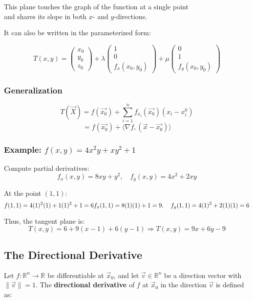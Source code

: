 \noindent This plane touches the graph of the function at a single point\\
and shares its slope in both \( x \)- and \( y \)-directions.

\noindent It can also be written in the parameterized form:

\[
T(x,y) = \begin{pmatrix} x_0\\ y_0\\ z_0\end{pmatrix} + \lambda 
\begin{pmatrix} 1\\ 0 \\ f_x(x_0,y_0)\end{pmatrix} + \mu \begin{pmatrix}
0 \\ 1 \\ f_y(x_0, y_0)
\end{pmatrix}
\]

\subsubsection{Generalization}
\[
T(\vec{X}) = f(\vec{x_0}) + \sum_{i = 1}^{n} f_{x_i}(\vec{x_0})(x_i - x_{i}^0)
\]
\[
 = f(\vec{x_0}) + \langle \nabla f, (\vec{x} - \vec{x_0})\rangle
\]

\subsubsection*{Example: \( f(x, y) = 4x^2y + xy^2 + 1 \)}

Compute partial derivatives:
\[
f_x(x, y) = 8xy + y^2, \quad f_y(x, y) = 4x^2 + 2xy
\]

At the point \( (1, 1) \):
\[
f(1, 1) = 4(1)^2(1) + 1(1)^2 + 1 = 6 \\
f_x(1, 1) = 8(1)(1) + 1 = 9, \quad f_y(1, 1) = 4(1)^2 + 2(1)(1) = 6
\]

Thus, the tangent plane is:
\[
T(x, y) = 6 + 9(x - 1) + 6(y - 1)
\Rightarrow T(x, y) = 9x + 6y - 9
\]

\subsection{The Directional Derivative}

Let \( f : \mathbb{R}^n \to \mathbb{R} \) be differentiable at \( \vec{x}_0 \), and let \( \vec{v} \in \mathbb{R}^n \) be a direction vector with \( \|\vec{v}\| = 1 \). The \textbf{directional derivative} of \( f \) at \( \vec{x}_0 \) in the direction \( \vec{v} \) is defined as:

